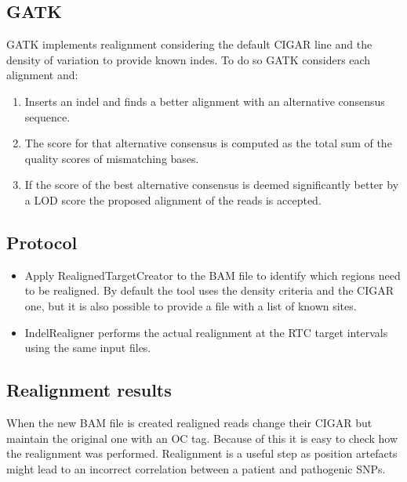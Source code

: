 	\subsection{GATK}
	GATK implements realignment considering the default CIGAR line and the density of variation to provide known indes.
	To do so GATK considers each alignment and:

	\begin{multicols}{2}
		\begin{enumerate}
			\item Inserts an indel and finds a better alignment with an alternative consensus sequence.
			\item The score for that alternative consensus is computed as the total sum of the quality scores of mismatching bases.
			\item If the score of the best alternative consensus is deemed significantly better by a LOD score the proposed alignment of the reads is accepted.
		\end{enumerate}
	\end{multicols}

	\subsection{Protocol}

	\begin{multicols}{2}
		\begin{itemize}
			\item Apply RealignedTargetCreator to the BAM file to identify which regions need to be realigned.
				By default the tool uses the density criteria and the CIGAR one, but it is also possible to provide a file with a list of known sites.
			\item IndelRealigner performs the actual realignment at the RTC target intervals using the same input files.
		\end{itemize}
	\end{multicols}

	\subsection{Realignment results}
	When the new BAM file is created realigned reads change their CIGAR but maintain the original one with an OC tag.
	Because of this it is easy to check how the realignment was performed.
	Realignment is a useful step as position artefacts might lead to an incorrect correlation between a patient and pathogenic SNPs.

